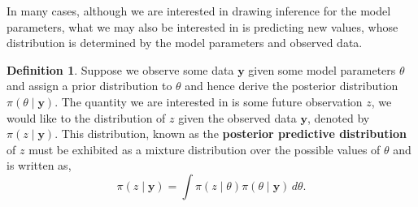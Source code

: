 \documentclass[
]{book}
\theoremstyle{definition}
\newtheorem{definition}{Definition}[chapter]
\theoremstyle{definition}
\theoremstyle{definition}
\theoremstyle{definition}
\theoremstyle{remark}
\begin{document}
In many cases, although we are interested in drawing inference for the model parameters, what we may also be interested in is predicting new values, whose distribution is determined by the model parameters and observed data.

\begin{definition}
Suppose we observe some data \(\boldsymbol{y}\) given some model parameters \(\theta\) and assign a prior distribution to \(\theta\) and hence derive the posterior distribution \(\pi(\theta \mid \boldsymbol{y})\). The quantity we are interested in is some future observation \(z\), we would like to the distribution of \(z\) given the observed data \(\boldsymbol{y}\), denoted by \(\pi(z \mid \boldsymbol{y})\). This distribution, known as the \textbf{posterior predictive distribution} of \(z\) must be exhibited as a mixture distribution over the possible values of \(\theta\) and is written as,
\[
\pi(z \mid \boldsymbol{y}) = \int \pi(z \mid \theta) \pi(\theta \mid \boldsymbol{y})\, d\theta.
\]
\end{definition}
\end{document}
